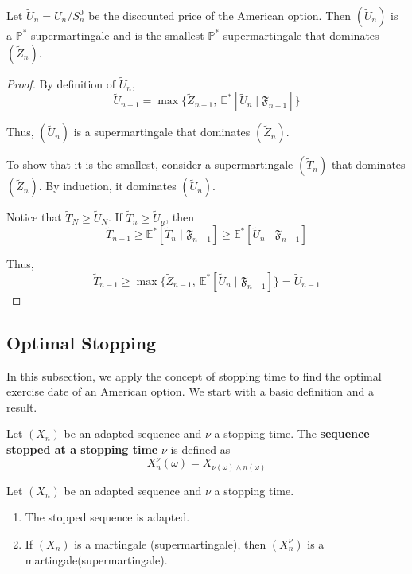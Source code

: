 \begin{proposition}
    Let $\tilde{U}_n = U_n/S_n^0$ be the discounted price of the American option. Then $(\tilde{U}_n)$ is a $\mathbb{P}^\ast$-supermartingale and is the smallest $\mathbb{P}^\ast$-supermartingale that dominates $(\tilde{Z}_n)$.
\end{proposition}

\begin{proof}
    By definition of $\tilde{U}_n$, 
    \[
        \tilde{U}_{n-1} = \max \{\tilde{Z}_{n-1}, ~\mathbb{E}^\ast [\tilde{U}_n \mid \mathfrak{F}_{n-1} ]\}
    \]
    
    Thus, $(\tilde{U}_n)$ is a supermartingale that dominates $(\tilde{Z}_n)$. 

    To show that it is the smallest, consider a supermartingale $(\tilde{T}_n)$ that dominates $(\tilde{Z}_n)$. By induction, it dominates $(\tilde{U}_n)$. 

    Notice that $\tilde{T}_N \ge \tilde{U}_N$. If $\tilde{T}_n \ge \tilde{U}_n$, then 
    \[
        \tilde{T}_{n-1} \ge \mathbb{E}^\ast [\tilde{T}_n \mid \mathfrak{F}_{n-1}] \ge \mathbb{E}^\ast [\tilde{U}_n \mid \mathfrak{F}_{n-1}]
    \]

    Thus, 
    \[
        \tilde{T}_{n-1} \ge \max \{ \tilde{Z}_{n-1}, ~\mathbb{E}^\ast [\tilde{U}_n \mid \mathfrak{F}_{n-1}] \} = \tilde{U}_{n-1}
    \]
\end{proof}

\subsection{Optimal Stopping}

In this subsection, we apply the concept of stopping time to find the optimal exercise date of an American option. We start with a basic definition and a result.

\begin{definition}
    Let $(X_n)$ be an adapted sequence and $\nu$ a stopping time. The \textbf{sequence stopped at a stopping time} $\nu$ is defined as
    \[
        X_n^\nu(\omega) = X_{\nu(\omega) \wedge n(\omega)}
    \]
\end{definition}

\begin{proposition}
    Let $(X_n)$ be an adapted sequence and $\nu$ a stopping time.
    \begin{enumerate}
        \item The stopped sequence is adapted.
        \item If $(X_n)$ is a martingale (supermartingale), then $(X_n^\nu)$ is a martingale(supermartingale).
    \end{enumerate}
\end{proposition}

